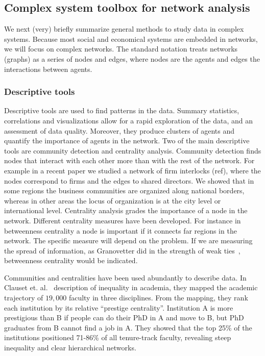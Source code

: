 \subsection{Complex system toolbox for network analysis}
We next (very) briefly summarize general methods to study data in complex systems.
Because most social and economical systems are embedded in networks, we will focus on complex networks. 
The standard notation treats networks (graphs) as a series of nodes and edges, where nodes are the agents and edges the interactions between agents.


\subsubsection{Descriptive tools}
Descriptive tools are used to find patterns in the data.
Summary statistics, correlations and visualizations allow for a rapid exploration of the data, and an assessment of data quality.
Moreover, they produce clusters of agents and quantify the importance of agents in the network.
Two of the main descriptive tools are community detection and centrality analysis.
Community detection finds nodes that interact with each other more than with the rest of the network.
For example in a recent paper we studied a network of firm interlocks (ref), 
where the nodes correspond to firms and the edges to shared directors.
We showed that in some regions the business communities are organized along national borders, 
whereas in other areas the locus of organization is at the city level or international level. 
Centrality analysis grades the importance of a node in the network. 
Different centrality measures have been developed. 
For instance in betweenness centrality a node is important if it connects far regions in the network. 
The specific measure will depend on the problem. 
If we are measuring the spread of information, 
as Granovetter did in the strength of weak ties~\citep{Granovetter1973}, 
betweenness centrality would be indicated.


Communities and centralities have been used abundantly to describe data.
In Clauset et. al.~\citep{Clauset2015} description of inequality in academia, 
they mapped the academic trajectory of $19,000$ faculty in three disciplines.
From the mapping, they rank each institution by its relative ``prestige centrality''.
Institution A is more prestigious than B if people can do their PhD in A and move to B, 
but PhD graduates from B cannot find a job in A.
They showed that the top 25\% of the institutions positioned 71-86\% of all tenure-track faculty,
revealing steep inequality and clear hierarchical networks.

